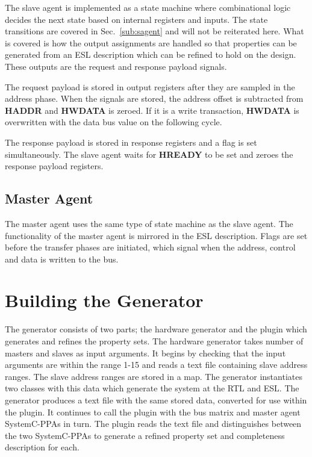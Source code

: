 The slave agent is implemented as a state machine where combinational logic decides the next state based on internal registers and inputs. The state transitions are covered in Sec.~\ref{sub:sagent} and will not be reiterated here. What is covered is how the output assignments are handled so that properties can be generated from an ESL description which can be refined to hold on the design. These outputs are the request and response payload signals. \par
The request payload is stored in output registers after they are sampled in the address phase. When the signals are stored, the address offset is subtracted from \textbf{HADDR} and \textbf{HWDATA} is zeroed. If it is a write transaction, \textbf{HWDATA} is overwritten with the data bus value on the following cycle. \par
The response payload is stored in response registers and a flag is set simultaneously. The slave agent waits for \textbf{HREADY} to be set and zeroes the response payload registers.  



\subsection{Master Agent}
The master agent uses the same type of state machine as the slave agent. The functionality of the master agent is mirrored in the ESL description. Flags are set before the transfer phases are initiated, which signal when the address, control and data is written to the bus. 


\section{Building the Generator}
The generator consists of two parts; the hardware generator and the plugin which generates and refines the property sets. The hardware generator takes number of masters and slaves as input arguments. It begins by checking that the input arguments are within the range 1-15 and reads a text file containing slave address ranges. The slave address ranges are stored in a map. The generator instantiates two classes with this data which generate the system at the RTL and ESL. The generator produces a text file with the same stored data, converted for use within the plugin. It continues to call the plugin with the bus matrix and master agent SystemC-PPAs in turn. The plugin reads the text file and distinguishes between the two SystemC-PPAs to generate a refined property set and completeness description for each. 

